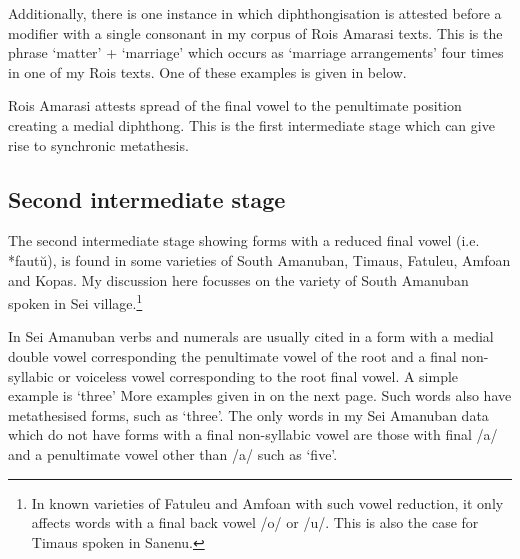 Additionally, there is one instance in which diphthongisation
is attested before a modifier with a single consonant in my
corpus of Ro{\Q}is Amarasi texts.
This is the phrase  `matter' +  `marriage'
which occurs as  `marriage arrangements' four
times in one of my Ro{\Q}is texts.
One of these examples is given in  below.

\begin{exe}
	\label{ex:RO-170830-1-06-54}
\end{exe}

Ro{\Q}is Amarasi attests spread of the final
vowel to the penultimate position creating a medial
diphthong. This is the first intermediate
stage which can give rise to synchronic metathesis.

\subsection{Second intermediate stage}
The second intermediate stage showing forms with
a reduced final vowel (i.e. *faut\u{u}),
is found in some varieties of South Amanuban,
Timaus, Fatule{\Q}u, Amfo{\Q}an and Kopas.
My discussion here focusses on the variety of
South Amanuban spoken in Se{\Q}i village.\footnote{
		In known varieties of Fatule{\Q}u and Amfo{\Q}an
		with such vowel reduction, it only affects words with a final
		back vowel /o/ or /u/. This is also the case
		for Timaus spoken in Sanenu.}

In Se{\Q}i Amanuban verbs and numerals are usually
cited in a form with a medial double vowel
corresponding the penultimate vowel of the root
and a final non-syllabic or voiceless vowel
corresponding to the root final vowel.
A simple example is  {\ra}  `three'
More examples given in  on the next page.
Such words also have metathesised forms,
such as  {\ra}  `three'.
The only words in my Se{\Q}i Amanuban data which do not have
forms with a final non-syllabic vowel are those with final /a/
and a penultimate vowel other than /a/ such as  {\ra}  `five'.

